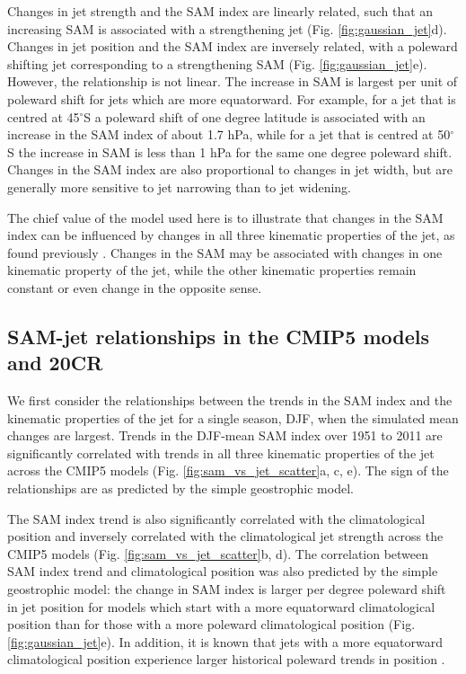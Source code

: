 \documentclass{ametsoc}
\begin{document}
Changes in jet strength and the SAM index are linearly related, such that an increasing SAM is
associated with a strengthening jet (Fig. \ref{fig:gaussian_jet}d). Changes in jet position and 
the SAM index are inversely related, with a poleward shifting jet corresponding 
to a strengthening SAM (Fig. \ref{fig:gaussian_jet}e).  However, the relationship
is not linear. The increase in SAM is largest per unit of poleward shift for jets 
which are more equatorward. For example, for a jet that is centred at 45$^{\circ}$S a poleward shift of one 
degree latitude is associated with an increase in the SAM index of about 1.7 hPa, while 
for a jet that is centred at 50$^{\circ}$S the increase in SAM is less than 1 hPa for 
the same one degree poleward shift. Changes in the SAM index are also proportional to changes 
in jet width, but are generally more sensitive to jet narrowing than to jet widening.

The chief value of the model used here is to illustrate that changes in the SAM index can be
influenced by changes in all three kinematic properties of the jet, as found previously 
\citep{Monahan_and_Fyfe_2006, Monahan_and_Fyfe_2008}. Changes in the SAM may be associated 
with changes in one kinematic property of the jet, while the other kinematic properties 
remain constant or even change in the opposite sense. 

\subsection{SAM-jet relationships in the CMIP5 models and 20CR}
We first consider the relationships between the trends in the SAM index and the kinematic
properties of the jet for a single season, DJF, when the simulated mean changes are largest. Trends 
in the DJF-mean SAM index over 1951 to 2011 are significantly correlated with 
trends in all three kinematic properties of the jet across 
the CMIP5 models (Fig. \ref{fig:sam_vs_jet_scatter}a, c, e). The sign of the relationships 
are as predicted by the simple geostrophic model. 

The SAM index trend is also significantly correlated with the climatological 
position and inversely correlated with the climatological jet strength across the CMIP5 models 
(Fig. \ref{fig:sam_vs_jet_scatter}b, d). The correlation between
SAM index trend and climatological position was also predicted by the simple geostrophic model: 
the change in SAM index is larger per degree poleward shift in jet position for models which start with  
a more equatorward climatological position than for those with a more poleward climatological 
position (Fig. \ref{fig:gaussian_jet}e). In addition, it is known that jets with a more equatorward 
climatological position experience larger historical poleward trends in position 
\citep{Kidston_and_Gerber_2010, Bracegirdle_et_al_2013}. 
\end{document}
